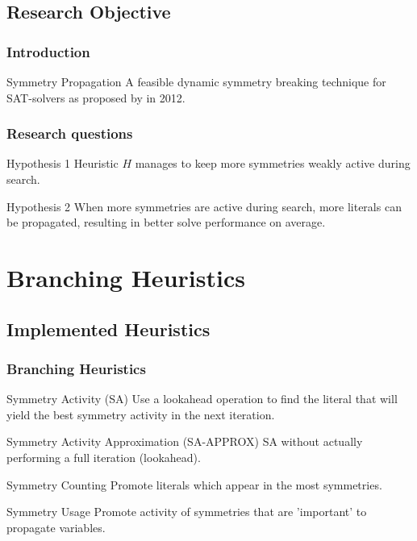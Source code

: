 \documentclass{beamer}
\begin{document}
	\subsection{Research Objective}
	\begin{frame}
		\frametitle{Introduction}
		\begin{block}{Symmetry Propagation}
			A feasible dynamic symmetry breaking technique for SAT-solvers as proposed by
			\cite{devriendt2012symmetry} in 2012.
		\end{block}
	\end{frame}

	\begin{frame}
		\frametitle{Research questions}
		\begin{block}{Hypothesis 1}
			\label{hyp:increased_activity}
			Heuristic $H$ manages to keep more symmetries weakly active during search.
		\end{block}

		\begin{block}{Hypothesis 2}
			\label{hyp:activity_equals_speed}
			When more symmetries are active during search, more literals can be propagated, resulting in
			better solve performance on average.
		\end{block}
	\end{frame}

\section{Branching Heuristics}

	\subsection{Implemented Heuristics}
	\begin{frame}%
		\frametitle{Branching Heuristics}

		\begin{block}{Symmetry Activity (SA)}
			Use a lookahead operation to find the literal that will yield the best symmetry activity
			in the next iteration.
		\end{block}

		\begin{block}{Symmetry Activity Approximation (SA-APPROX)}
			SA without actually performing a full iteration (lookahead).
		\end{block}

		\begin{block}{Symmetry Counting}
			Promote literals which appear in the most symmetries.
		\end{block}

		\begin{block}{Symmetry Usage}
			Promote activity of symmetries that are
			'important' to propagate variables.
		\end{block}
	\end{frame}
\end{document}
